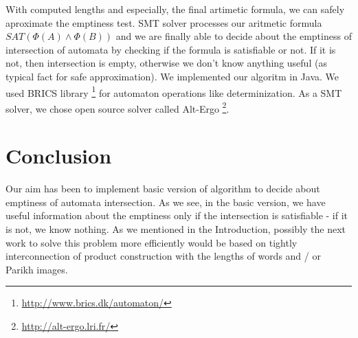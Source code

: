 With computed lengths and especially, the final artimetic formula, we can safely aproximate the emptiness test. SMT solver processes our aritmetic formula $SAT(\Phi(A) \wedge \Phi(B))$ and we are finally able to decide about the emptiness of intersection of automata by checking if the formula is satisfiable or not. If it is not, then intersection is empty, otherwise we don't know anything useful (as typical fact for safe approximation).
We implemented our algoritm in Java. We used BRICS library \footnote{\url{http://www.brics.dk/automaton/}} for automaton operations like determinization. As a SMT solver, we chose open source solver called Alt-Ergo \footnote{\url{http://alt-ergo.lri.fr/}}.
\chapter{Conclusion}
Our aim has been to implement basic version of algorithm to decide about emptiness of automata intersection. As we see, in the basic version, we have useful information about the emptiness only if the intersection is satisfiable - if it is not, we know nothing. As we mentioned in the Introduction, possibly the next work to solve this problem more efficiently would be based on tightly interconnection of product construction with the lengths of words and / or Parikh images.
